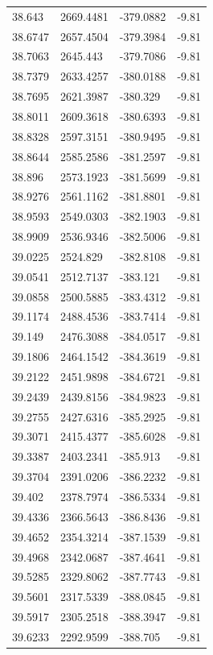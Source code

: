 \begin{table}[H]
\begin{tabular}{llll}
38.643 & 2669.4481 & -379.0882 & -9.81 \\
38.6747 & 2657.4504 & -379.3984 & -9.81 \\
38.7063 & 2645.443 & -379.7086 & -9.81 \\
38.7379 & 2633.4257 & -380.0188 & -9.81 \\
38.7695 & 2621.3987 & -380.329 & -9.81 \\
38.8011 & 2609.3618 & -380.6393 & -9.81 \\
38.8328 & 2597.3151 & -380.9495 & -9.81 \\
38.8644 & 2585.2586 & -381.2597 & -9.81 \\
38.896 & 2573.1923 & -381.5699 & -9.81 \\
38.9276 & 2561.1162 & -381.8801 & -9.81 \\
38.9593 & 2549.0303 & -382.1903 & -9.81 \\
38.9909 & 2536.9346 & -382.5006 & -9.81 \\
39.0225 & 2524.829 & -382.8108 & -9.81 \\
39.0541 & 2512.7137 & -383.121 & -9.81 \\
39.0858 & 2500.5885 & -383.4312 & -9.81 \\
39.1174 & 2488.4536 & -383.7414 & -9.81 \\
39.149 & 2476.3088 & -384.0517 & -9.81 \\
39.1806 & 2464.1542 & -384.3619 & -9.81 \\
39.2122 & 2451.9898 & -384.6721 & -9.81 \\
39.2439 & 2439.8156 & -384.9823 & -9.81 \\
39.2755 & 2427.6316 & -385.2925 & -9.81 \\
39.3071 & 2415.4377 & -385.6028 & -9.81 \\
39.3387 & 2403.2341 & -385.913 & -9.81 \\
39.3704 & 2391.0206 & -386.2232 & -9.81 \\
39.402 & 2378.7974 & -386.5334 & -9.81 \\
39.4336 & 2366.5643 & -386.8436 & -9.81 \\
39.4652 & 2354.3214 & -387.1539 & -9.81 \\
39.4968 & 2342.0687 & -387.4641 & -9.81 \\
39.5285 & 2329.8062 & -387.7743 & -9.81 \\
39.5601 & 2317.5339 & -388.0845 & -9.81 \\
39.5917 & 2305.2518 & -388.3947 & -9.81 \\
39.6233 & 2292.9599 & -388.705 & -9.81 \\

\end{tabular}
\end{table}

